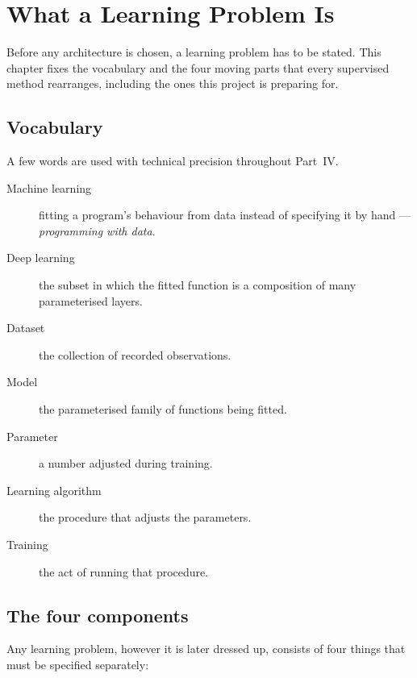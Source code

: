 \setchapterpreamble[u]{\margintoc}
\chapter{What a Learning Problem Is}


Before any architecture is chosen, a learning problem has to be stated. This
chapter fixes the vocabulary and the four moving parts that every supervised
method rearranges, including the ones this project is preparing for.

\section{Vocabulary}

A few words are used with technical precision throughout Part~IV.

\begin{description}
	\item[Machine learning] fitting a program's behaviour from data instead of
	specifying it by hand --- \emph{programming with data}.
	\item[Deep learning] the subset in which the fitted function is a
	composition of many parameterised layers.
	\item[Dataset] the collection of recorded observations.
	\item[Model] the parameterised family of functions being fitted.
	\item[Parameter] a number adjusted during training.
	\item[Learning algorithm] the procedure that adjusts the parameters.
	\item[Training] the act of running that procedure.
\end{description}


\section{The four components}

Any learning problem, however it is later dressed up, consists of four things
that must be specified separately:

